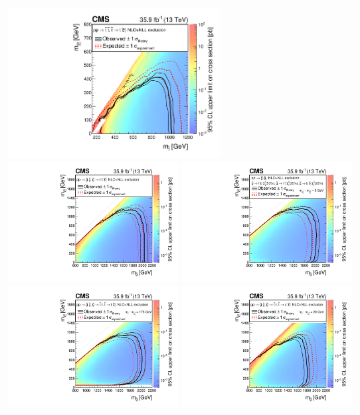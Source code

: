 \begin{figure}[ht!]
 \begin{centering}
  \includegraphics[width=0.50\textwidth]{sections/mc4/Results/figures/Covered_T2tt_OnlyXSEC.pdf}\\
  \includegraphics[width=0.40\textwidth]{sections/mc4/Results/figures/T1tttt_OnlyXSEC.pdf}
  \includegraphics[width=0.40\textwidth]{sections/mc4/Results/figures/T1ttbb_OnlyXSEC.pdf}\\
  \includegraphics[width=0.40\textwidth]{sections/mc4/Results/figures/T5ttttdM175_OnlyXSEC.pdf}
  \includegraphics[width=0.40\textwidth]{sections/mc4/Results/figures/T5ttcc_OnlyXSEC.pdf}\\

\end{centering}
\end{figure}
